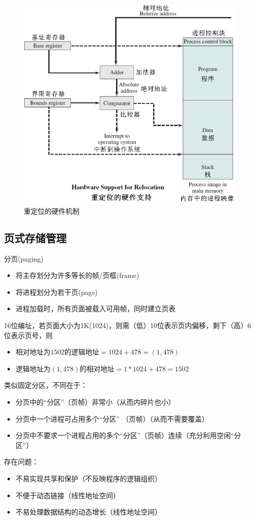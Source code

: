 \begin{figure}[H]
    \centering
    \includegraphics[width=0.5\linewidth]{fig/relocation.png}
    \caption*{重定位的硬件机制}
\end{figure}

\subsection{页式存储管理}
分页(paging)
\begin{itemize}
    \item 将主存划分为许多等长的帧/页框(frame)
    \item 将进程划分为若干页(page)
    \item 进程加载时，所有页面被载入可用帧，同时建立页表
\end{itemize}

\begin{example}
    16位编址，若页面大小为1K(1024)，则需（低）10位表示页内偏移，剩下（高）6位表示页号，则
    \begin{itemize}
        \item 相对地址为$1502$的逻辑地址$ = 1024 + 478 = (1, 478)$
        \item 逻辑地址为$(1, 478)$的相对地址$ = 1*1024 + 478 = 1502$
    \end{itemize}
\end{example}

类似固定分区，不同在于：
\begin{itemize}
    \item 分页中的“分区”（页帧）非常小（从而内碎片也小）
    \item 分页中一个进程可占用多个“分区” （页帧）（从而不需要覆盖）
    \item 分页中不要求一个进程占用的多个“分区”（页帧）连续（充分利用空闲“分区”）
\end{itemize}
存在问题：
\begin{itemize}
\item 不易实现共享和保护（不反映程序的逻辑组织）
\item 不便于动态链接（线性地址空间）
\item 不易处理数据结构的动态增长（线性地址空间）
\end{itemize}

